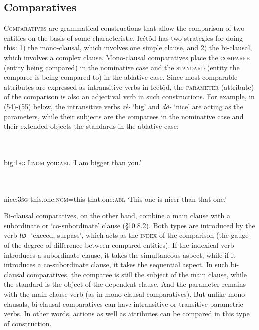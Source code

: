 \subsection{Comparatives}


\textsc{Comparatives} are grammatical constructions that allow the comparison of two entities on the basis of some characteristic. Icétôd has two strategies for doing this: 1) the mono-clausal, which involves one simple clause, and 2) the bi-clausal, which involves a complex clause. Mono-clausal comparatives place the \textsc{comparee} (entity being compared) in the nominative case and the \textsc{standard} (entity the comparee is being compared to) in the ablative case. Since most comparable attributes are expressed as intransitive verbs in Icétôd, the \textsc{parameter} (attribute) of the comparison is also an adjectival verb in such constructions. For example, in (54)-(55) below, the intransitive verbs \textit{zè-} ‘big’ and \textit{dà-} ‘nice’ are acting as the parameters, while their subjects are the comparees in the nominative case and their extended objects the standards in the ablative case:




\ea\label{ex:}
 \\
    \\
big:\textsc{1sg}   I:\textsc{nom}   you:\textsc{abl}
\glt ‘I am bigger than you.’ 
\z




\ea\label{ex:}
 \\
    \\
nice:\textsc{3sg}   this.one:\textsc{nom}=this   that.one:\textsc{abl}
\glt ‘This one is nicer than that one.’ 
\z


Bi-clausal comparatives, on the other hand, combine a main clause with a subordinate or ‘co-subordinate’ clause (§10.8.2). Both types are introduced by the verb \textit{ɨlɔ-} ‘exceed, surpass’, which acts as the \textsc{index} of the comparison (the gauge of the degree of difference between compared entities). If the indexical verb introduces a subordinate clause, it takes the simultaneous aspect, while if it introduces a co-subordinate clause, it takes the sequential aspect. In such bi-clausal comparatives, the comparee is still the subject of the main clause, while the standard is the object of the dependent clause. And the parameter remains with the main clause verb (as in mono-clausal comparatives). But unlike mono-clausals, bi-clausal comparatives can have intransitive or transitive parametric verbs. In other words, actions as well as attributes can be compared in this type of construction.

